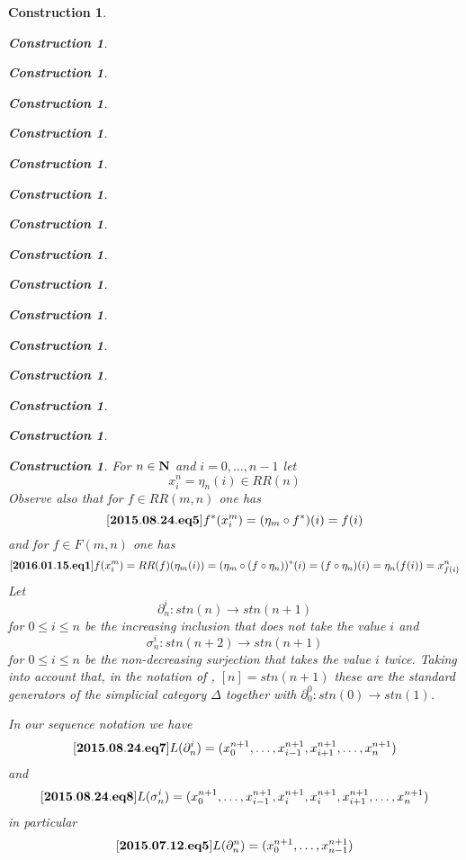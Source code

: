 \documentclass[12pt]{amsart}
\newenvironment{eq}{\begin{equation}}{\end{equation}}
\newtheorem{construction}[proposition]{Construction}
\newcommand{\llabel}[1]{\label{#1}[{\bf #1}]}
\newcommand{\sr}{\rightarrow}
\newcommand{\nn}{{\bf N\rm}}
\newcommand{\nat}{\nn}
\newcommand{\mbind}[1]{{#1^*}}
\begin{document}
\begin{construction}
\begin{construction}
\begin{construction}
\begin{construction}
\begin{construction}
\begin{construction}
\begin{construction}
\begin{construction}
\begin{construction}
\begin{construction}
\begin{construction}
\begin{construction}
\begin{construction}
\begin{construction}
\begin{construction}
\begin{construction}
%
For $n\in\nat$ and $i=0,\dots,n-1$ let
%
$$x_i^n=\eta_{n}(i)\in RR(n)$$
%
Observe also that for $f\in RR(m,n)$ one has
%
\begin{eq}\llabel{2015.08.24.eq5}
\mbind{f}(x_i^m)=(\eta_{m}\circ\mbind{f})(i)=f(i)
\end{eq}
%
and for $f\in F(m,n)$ one has
%
\begin{eq}\llabel{2016.01.15.eq1}
f(x_i^m)=RR(f)(\eta_{m}(i))=(\eta_{m}\circ \mbind{(f\circ \eta_{n}))}(i)=(f\circ \eta_{n})(i)=\eta_{n}(f(i))=x_{f(i)}^n
\end{eq}
%
Let 
%
$$\partial^{i}_{n}:stn(n)\sr stn(n+1)$$
%
for $0\le i\le n$ be the increasing inclusion that does not take the value $i$ and
%
$$\sigma^{i}_{n}:stn(n+2)\sr stn(n+1)$$
%
for $0\le i\le n$ be the non-decreasing surjection that takes the value $i$ twice. Taking into account that, in the notation of \cite{GabZis}, $[n]=stn(n+1)$ these are the standard generators of the simplicial category $\Delta$ together with $\partial^0_0:stn(0)\sr stn(1)$. 

In our sequence notation we have
%
\begin{eq}\llabel{2015.08.24.eq7}
L(\partial^{i}_{n})=(x_0^{n+1},\dots,x_{i-1}^{n+1},x_{i+1}^{n+1},\dots,x_n^{n+1})
\end{eq}
%
and
%
\begin{eq}\llabel{2015.08.24.eq8}
L(\sigma^{i}_{n})=(x_0^{n+1},\dots,x_{i-1}^{n+1},x_i^{n+1},x_i^{n+1},x_{i+1}^{n+1},\dots,x_n^{n+1})
\end{eq}
%
in particular
%
\begin{eq}\llabel{2015.07.12.eq5}
L(\partial^{n}_n)=(x_0^{n+1},\dots,x_{n-1}^{n+1})
\end{eq}
%


\end{construction}
\end{construction}
\end{construction}
\end{construction}
\end{construction}
\end{construction}
\end{construction}
\end{construction}
\end{construction}
\end{construction}
\end{construction}
\end{construction}
\end{construction}
\end{construction}
\end{construction}
\end{construction}
\end{document}
